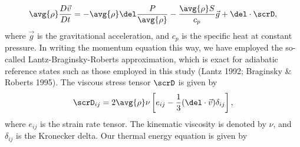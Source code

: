 \documentclass[12pt,letterpaper]{article}
\begin{document}
\begin{equation}  %
  \label{eq:momentum}
\begin{split}
  \avg{\rho}\frac{D\vec{v}}{Dt}
  =
  -\avg{\rho}\del\frac{P}{\avg{\rho}} - \frac{\avg{\rho}S}{c_p} \vec{g} + \del \cdot \scrD,
\end{split}
\end{equation}
where $\vec{g}$ is the gravitational acceleration, and $c_p$ is the specific heat at constant pressure.  In writing the momentum equation this way, we have employed the so-called Lantz-Braginsky-Roberts approximation, which is exact for adiabatic reference states such as those employed in this study (Lantz 1992; Braginsky \& Roberts 1995).  The viscous stress tensor $\scrD$ is given by 
\begin{equation}  %
\label{eq:stress}
  \scrD_{ij} = 2 \avg{\rho} \nu \left[e_{ij}
    - \frac{1}{3}(\del \cdot \vec{v})\delta_{ij} \right],
\end{equation}
where $e{_{ij}}$ is the strain rate tensor. The kinematic viscosity is denoted by $\nu$, and $\delta_{ij}$ is the Kronecker delta. Our thermal energy equation is given by
\end{document}

